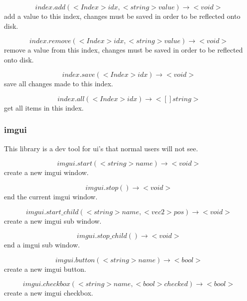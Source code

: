 \documentclass[11pt,fleqn]{book} %
\begin{document}
\begin{equation}
index.add(<Index> idx, <string> value) \rightarrow <void>
\end{equation}
add a value to this index, changes must be saved in order to be reflected onto disk.

\begin{equation}
index.remove(<Index> idx, <string> value) \rightarrow <void>
\end{equation}
remove a value from this index, changes must be saved in order to be reflected onto disk.

\begin{equation}
index.save(<Index> idx) \rightarrow <void>
\end{equation}
save all changes made to this index.

\begin{equation}
index.all(<Index> idx) \rightarrow <[]string>
\end{equation}
get all items in this index.

\subsubsection{imgui}
This library is a dev tool for ui's that normal users will not see.

\begin{equation}
imgui.start(<string> name) \rightarrow <void>
\end{equation}
create a new imgui window.

\begin{equation}
imgui.stop() \rightarrow <void>
\end{equation}
end the current imgui window.

\begin{equation}
imgui.start\_child(<string> name, <vec2> pos) \rightarrow <void>
\end{equation}
create a new imgui sub window.

\begin{equation}
imgui.stop\_child() \rightarrow <void>
\end{equation}
end a imgui sub window.

\begin{equation}
imgui.button(<string> name) \rightarrow <bool>
\end{equation}
create a new imgui button.

\begin{equation}
imgui.checkbox(<string> name, <bool> checked) \rightarrow <bool>
\end{equation}
create a new imgui checkbox.
\end{document}

